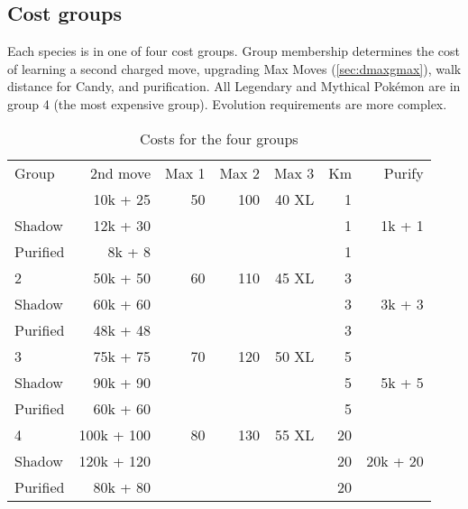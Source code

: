 \subsection{Cost groups\label{subsec:costgroups}}
Each species is in one of four cost groups.
Group membership determines the cost of
  learning a second charged move,
  upgrading Max Moves (\autoref{sec:dmaxgmax}),
  walk distance for Candy,
  and purification.
All Legendary and Mythical Pokémon are in group 4 (the most expensive group).
Evolution requirements are more complex.
\begin{table}
\centering
\begin{tabular}{lrrrrrr}
  Group & 2nd move   & Max 1 & Max 2 & Max 3 & Km & Purify\\
\Midrule
      1 & 10k + 25   & 50    & 100   & 40 XL & 1  &       \\
  Shadow& 12k + 30   &       &       &       & 1  & 1k + 1\\
Purified& 8k + 8   &       &       &       & 1  &         \\
      2 & 50k + 50   & 60    & 110   & 45 XL & 3  &       \\
  Shadow& 60k + 60   &       &       &       & 3  & 3k + 3\\
  Purified& 48k + 48   &       &       &       & 3  &     \\
      3 & 75k + 75   & 70    & 120   & 50 XL & 5  &       \\
  Shadow& 90k + 90   &       &       &       & 5  & 5k + 5\\
  Purified & 60k + 60 &   &    &   & 5 &                  \\
      4 & 100k + 100 & 80    & 130   & 55 XL & 20 &       \\
  Shadow& 120k + 120 &       &       &       & 20 & 20k + 20\\
Purified& 80k + 80 &   &    &   & 20 & \\
\end{tabular}
  \caption{Costs for the four groups\label{table:costs}}
\end{table}

